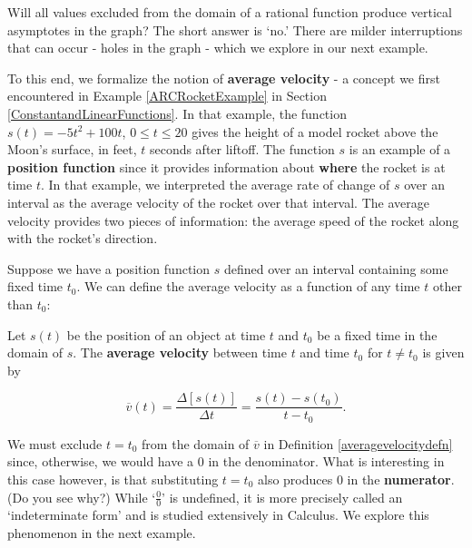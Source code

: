 Will all  values excluded from the domain of a rational function produce vertical asymptotes in the graph?  The short answer is `no.'  There are milder interruptions that can occur - holes in the graph - which we explore in our next example.  

To this end, we formalize the notion of \textbf{average velocity} - a concept we first encountered in  Example \ref{ARCRocketExample} in Section \ref{ConstantandLinearFunctions}. In that example, the function $s(t) = -5t^2+100t$, $0 \leq t \leq 20$ gives the height of a model rocket above the Moon's surface, in feet,  $t$ seconds after liftoff.  The function $s$ is an example of a \textbf{position function} since it provides information about \textbf{where} the rocket is at time $t$.   In that example, we interpreted the average rate of change of $s$ over an interval as the average velocity of the rocket over that interval.  The average velocity provides two pieces of information:  the average speed of the rocket along with the rocket's direction.  

Suppose we have a position function $s$ defined over an interval containing some fixed time $t_{0}$.  We can define the average velocity as a function of any time $t$ other than $t_{0}$:

\bigskip

\colorbox{ResultColor}{\bbm

\begin{defn} \label{averagevelocitydefn} Let $s(t)$ be the position of an object at time $t$ and $t_{0}$ be a fixed time in the domain of $s$.  The \textbf{average velocity} between time $t$ and time $t_{0}$  for $t \neq t_{0}$ is given by

\[ \overline{v}(t) = \dfrac{\Delta [s(t)]}{\Delta t} = \dfrac{s(t) - s(t_{0})}{t - t_{0}}. \]
\end{defn}

\ebm}

\bigskip

We must exclude $t = t_{0}$ from the domain of $\overline{v}$ in Definition \ref{averagevelocitydefn} since, otherwise, we would have a $0$ in the denominator.  What is interesting in this case however, is that substituting $t = t_{0}$ also produces $0$ in the \textbf{numerator}. (Do you see why?)  While `$\frac{0}{0}$' is undefined, it is more precisely called an `indeterminate form' and is studied extensively in Calculus.  We explore this phenomenon  in the next example.

